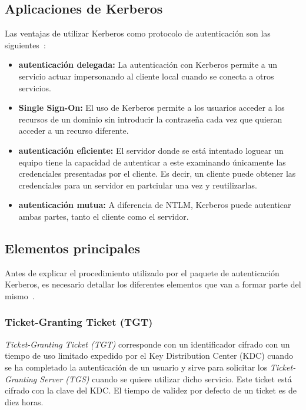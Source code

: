 \subsection{Aplicaciones de Kerberos}

Las ventajas de utilizar Kerberos como protocolo de au\-ten\-ti\-ca\-ción son las siguientes~\cite{Capitulo3:Kerberos3}:

\begin{itemize}
\item \textbf{au\-ten\-ti\-ca\-ción delegada:} La au\-ten\-ti\-ca\-ción con Kerberos permite a un servicio actuar impersonando al cliente local cuando se conecta a otros servicios.
\item \textbf{Single Sign-On:} El uso de Kerberos permite a los usuarios acceder a los recursos de un dominio sin introducir la contraseña cada vez que quieran acceder a un recurso diferente.
\item \textbf{au\-ten\-ti\-ca\-ción eficiente:} El servidor donde se está intentado loguear un equipo tiene la capacidad de autenticar a este examinando únicamente las credenciales presentadas por el cliente. Es decir, un cliente puede obtener las credenciales para un servidor en partciular una vez y reutilizarlas. 
\item \textbf{au\-ten\-ti\-ca\-ción mutua:} A diferencia de NTLM, Kerberos puede autenticar ambas partes, tanto el cliente como el servidor. 
\end{itemize}

\subsection{Elementos principales}

Antes de explicar el procedimiento utilizado por el paquete de au\-ten\-ti\-ca\-ción Kerberos, es necesario detallar los diferentes elementos que van a formar parte del mismo~\cite{Capitulo3:Kerberos4}. 

\subsubsection{Ticket-Granting Ticket (TGT)}

{\it Ticket-Granting Ticket (TGT)} corresponde con un identificador cifrado con un tiempo de uso limitado expedido por el Key Distribution Center (KDC) cuando se ha completado la au\-ten\-ti\-ca\-ción de un usuario y sirve para solicitar los {\it Ticket-Granting Server (TGS)} cuando se quiere utilizar dicho servicio. Este ticket está cifrado con la clave del KDC. El tiempo de validez por defecto de un ticket es de diez horas. 

